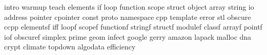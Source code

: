 intro
warmup
teach
elements
if
loop
function
scope
struct
object
array
string
io
address
pointer
cpointer
const
proto
namespace
cpp
template
error
stl
obscure
ccpp
elementsf
iff
loopf
scopef
functionf
stringf
structf
modulef
classf
arrayf
pointf
iof
obscuref
simplex
prime
geom
infect
google
gerry
amazon
lapack
malloc
dna
crypt
climate
topdown
algodata
efficiency
